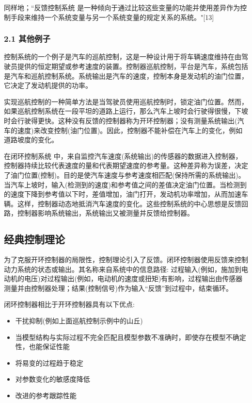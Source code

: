 同样地；“反馈控制系统 是一种倾向于通过比较这些变量的功能并使用差异作为控制手段来维持一个系统变量与另一个系统变量的规定关系的系统。"[13]

\subsubsection{2.1 其他例子}

控制系统的一个例子是汽车的巡航控制，这是一种设计用于将车辆速度维持在由驾驶员提供的恒定期望或参考速度的装置。控制器巡航控制，平台是汽车，系统包括是汽车和巡航控制系统。系统输出是汽车的速度，控制本身是发动机的油门位置，它决定了发动机提供的功率。

实现巡航控制的一种简单方法是当驾驶员使用巡航控制时，锁定油门位置。然而，如果巡航控制系统在一段平坦的道路上运行，那么汽车上坡时会行驶得很慢，下坡时会行驶得更快。这种没有反馈的控制器称为开环控制器；没有测量系统输出(汽车的速度)来改变控制(油门位置)。因此，控制器不能补偿在汽车上的变化，例如道路坡度的变化。

在闭环控制系统 中，来自监控汽车速度(系统输出)的传感器的数据进入控制器，控制器持续比较代表速度的量和代表期望速度的参考量。这种差异称为误差，决定了油门位置(控制)。目的是使汽车速度与参考速度相匹配(保持所需的系统输出)。当汽车上坡时，输入(检测到的速度)和参考值之间的差值决定油门位置。当检测到的速度下降到参考值以下时，差值增加，油门打开，发动机功率增加，从而加速车辆。这样，控制器动态地抵消汽车速度的变化。这些控制系统的中心思想是反馈回路，控制器影响系统输出，系统输出又被测量并反馈给控制器。

\subsection{经典控制理论}

为了克服开环控制器的局限性，控制理论引入了反馈。闭环控制器使用反馈来控制动力系统的状态或输出。其名称来自系统中的信息路径: 过程输入(例如，施加到电动机的电压)对过程输出(例如，电动机的速度或扭矩)有影响，过程输出由传感器测量并由控制器处理；结果(控制信号)作为输入“反馈”到过程中，结束循环。

闭环控制器相比于开环控制器具有以下优点:

\begin{itemize}
\item 干扰抑制(例如上面巡航控制示例中的山丘)
\item 当模型结构与实际过程不完全匹配且模型参数不准确时，即使存在模型不确定性，也能保证性能
\item 将易变的过程趋于稳定
\item 对参数变化的敏感度降低
\item 改进的参考跟踪性能
\end{itemize}

